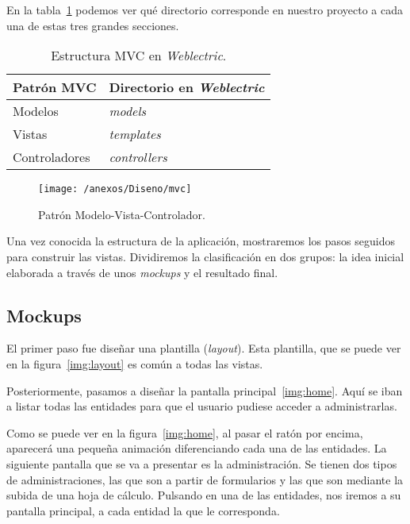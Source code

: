 En la tabla~\ref{tabla:estructuraMVC} podemos ver qué directorio corresponde en nuestro proyecto a cada una de estas tres grandes secciones.

\begin{table}[h]
	\centering
	\caption{Estructura MVC en \textit{Weblectric}.}
	\label{tabla:estructuraMVC}
	\begin{tabular}{p{5cm} p{5cm}}
		\toprule
		Patrón MVC 					 & Directorio en \textit{Weblectric}  \\ \midrule
		Modelos			        	 & \textit{models} 			    \\ 
		Vistas						 & \textit{templates}		    \\
		Controladores          		 & \textit{controllers}		 	\\ \bottomrule
	\end{tabular}
\end{table}

\begin{figure}[h]
	\centering
	\texttt{[image: /anexos/Diseno/mvc]}
	\caption{Patrón Modelo-Vista-Controlador.~\cite{img:MVC}}
	\label{img:mvc}
\end{figure}

\newpage

Una vez conocida la estructura de la aplicación, mostraremos los pasos seguidos para construir las vistas. Dividiremos la clasificación en dos grupos: la idea inicial elaborada a través de unos \textit{mockups} y el resultado final.

\subsection{Mockups} 

El primer paso fue diseñar una plantilla (\textit{layout}). Esta plantilla, que se puede ver en la figura~\ref{img:layout} es común a todas las vistas.

Posteriormente, pasamos a diseñar la pantalla principal~\ref{img:home}. Aquí se iban a listar todas las entidades para que el usuario pudiese acceder a administrarlas.

Como se puede ver en la figura~\ref{img:home}, al pasar el ratón por encima, aparecerá una pequeña animación diferenciando cada una de las entidades. La siguiente pantalla que se va a presentar es la administración. Se tienen dos tipos de administraciones, las que son a partir de formularios y las que son mediante la subida de una hoja de cálculo. Pulsando en una de las entidades, nos iremos a su pantalla principal, a cada entidad la que le corresponda. 

